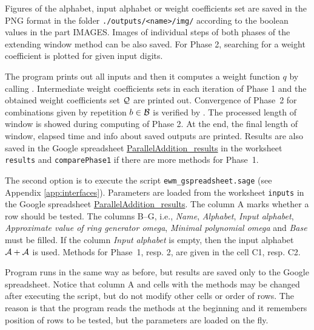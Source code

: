 Figures of the alphabet, input alphabet or weight coefficients set are saved in the PNG format in the folder \verb+./outputs/<name>/img/+ according to the boolean values in the part IMAGES. Images of individual steps of both phases of the extending window method can be also saved. For Phase 2, searching for a weight coefficient  is plotted for given input digits.  

The program prints out all inputs and then it computes a weight function $q$ by calling . Intermediate weight coefficients sets in each iteration of Phase 1 and the obtained weight coefficients set $\mathcal{Q}$ are printed out. Convergence of Phase~2 for combinations given by repetition $b\in\mathcal{B}$ is verified by . The processed length of window is showed during computing of Phase 2. At the end, the final length of window, elapsed time and info about saved outputs are printed. Results are also saved in the Google spreadsheet \href{https://docs.google.com/spreadsheets/d/1TnhrHdefHfHa0WSeVs4q6XVj3epjPlPlnoekE0E1xeM/edit?usp=sharing}{ParallelAddition\_results} in the worksheet \verb+results+ and \verb+comparePhase1+ if there are more methods for Phase~1.

The second option is to execute the script \verb+ewm_gspreadsheet.sage+ (see Appendix \ref{app:interfaces}). Parameters are loaded from the worksheet \verb+inputs+ in the Google spreadsheet \href{https://docs.google.com/spreadsheets/d/1TnhrHdefHfHa0WSeVs4q6XVj3epjPlPlnoekE0E1xeM/edit?usp=sharing}{ParallelAddition\_results}. The column A marks whether a row should be tested. The columns B--G, i.e., \emph{Name}, \emph{Alphabet}, \emph{Input alphabet}, \emph{Approximate value of ring generator omega}, \emph{Minimal polynomial omega} and \emph{Base} must be filled. If the column \emph{Input alphabet} is empty, then the input alphabet $\mathcal{A}+\mathcal{A}$ is used. Methods for Phase~1, resp. 2, are given in the cell C1, resp. C2.

Program runs in the same way as before, but results are saved only to the Google spreadsheet. Notice that column A and cells with the methods may be changed  after executing the script, but do not modify other cells or order of rows. The reason is that the program reads the methods at the beginning and it remembers position of rows to be tested, but the parameters are loaded on the fly.

